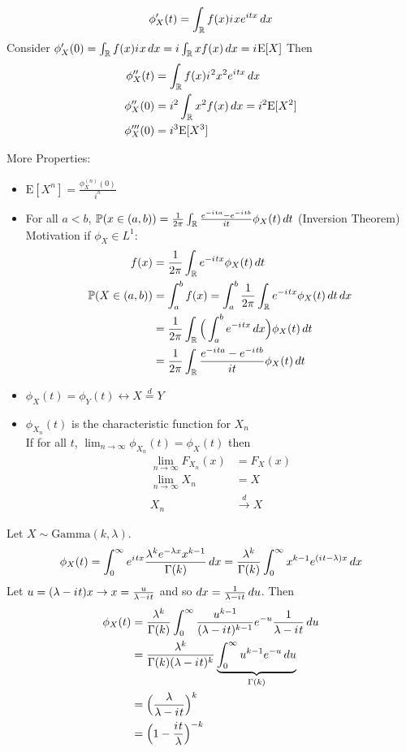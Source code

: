 \documentclass[12pt]{article}
\newcommand{\prob}[1]{\mathbb{P}(#1)}
\newcommand{\expected}[1]{\mathrm{E}[#1]}
\renewcommand{\i}{{i\mkern1mu}}
\begin{document}
$$\phi'_X(t) = \int_{\mathbb{R}} f(x) \i x e^{itx} \, dx $$ 
Consider $\phi'_X(0) = \int_{\mathbb{R}} f(x) \i x \, dx = i \int_{\mathbb{R}} xf(x) \, dx = \i \expected{X} $ Then $$ \begin{aligned} \phi_X'' (t) &= \int_{\mathbb{R}} f(x) \i^2 x^2 e^{\i tx} \, dx \\ \phi_X''(0) &= i^2 \int_{\mathbb{R}} x^2 f(x) \, dx = i^2 \expected{X^2} \\ \phi_X'''(0) &= i^3 \expected{X^3} \end{aligned} $$ 

More Properties: \begin{itemize} 
\item $\expected{X^n} = \frac{\phi_X^{(n)}(0)}{i^n} $ 
\item For all $a < b$, $\prob{x \in (a,b)} = \frac{1}{2\pi} \int_{\mathbb{R}} \frac{e^{-\i ta} - e^{-\i tb}}{it} \phi_X(t) \, dt $ (Inversion Theorem) \\
Motivation if $\phi_X \in L^1$: $$ \begin{aligned} f(x) &= \frac{1}{2\pi} \int_{\mathbb{R}} e^{-\i tx} \phi_X(t) \, dt \\ \prob{X \in (a,b)} &= \int_a^b f(x) = \int_a^b \frac{1}{2\pi} \int_{\mathbb{R}} e^{-\i tx} \phi_X(t) \, dt \, dx \\ &= \frac{1}{2\pi} \int_{\mathbb{R}} \Big( \int_a^b e^{-\i tx} \,dx \Big) \phi_X(t) \, dt \\ &= \frac{1}{2\pi} \int_{\mathbb{R}} \frac{e^{-\i ta} - e^{-\i tb}}{it} \phi_X(t) \, dt \end{aligned} $$ 
\item $\phi_X(t) = \phi_Y(t) \leftrightarrow X \stackrel{d}{=} Y $
\item $\phi_{X_n}(t)$ is the characteristic function for $X_n$ \\ 
If for all $t$, $\lim_{n \to \infty} \phi_{X_n}(t) = \phi_X(t)$ then $$ \begin{aligned} \lim_{n \to \infty} F_{X_n}(x) &= F_X(x) \\ \lim_{n \to \infty} X_n &= X \\ X_n &\stackrel{d}{\to} X \end{aligned} $$ \end{itemize} 

Let $X \sim \text{Gamma}(k, \lambda)$. $$ \phi_X(t) = \int_0^\infty e^{\i tx} \frac{\lambda^k e^{-\lambda x} x^{k - 1}}{\Gamma(k)} \, dx = \frac{\lambda^k}{\Gamma(k)} \int_0^\infty x^{k - 1} e^{(\i t - \lambda)x} \, dx $$ Let $u = (\lambda - \i t)x \to x = \frac{u}{\lambda - \i t}$ and so $dx = \frac{1}{\lambda - \i t} \, du$. Then $$ \begin{aligned} \phi_X(t) &= \frac{\lambda^k}{\Gamma(k)} \int_0^\infty \frac{u^{k - 1}}{(\lambda - \i t)^{k - 1}} e^{-u} \frac{1}{\lambda - \i t} \, du \\ &= \frac{\lambda^k}{\Gamma(k)(\lambda - \i t)^k} \underbrace{\int_0^\infty u^{k - 1} e^{-u} \, du}_{\Gamma(k)} \\ &= \Big( \frac{\lambda}{\lambda - \i t} \Big)^k \\ &= \Big( 1 - \frac{\i t}{\lambda} \Big)^{-k} \end{aligned} $$ 
\end{document}

